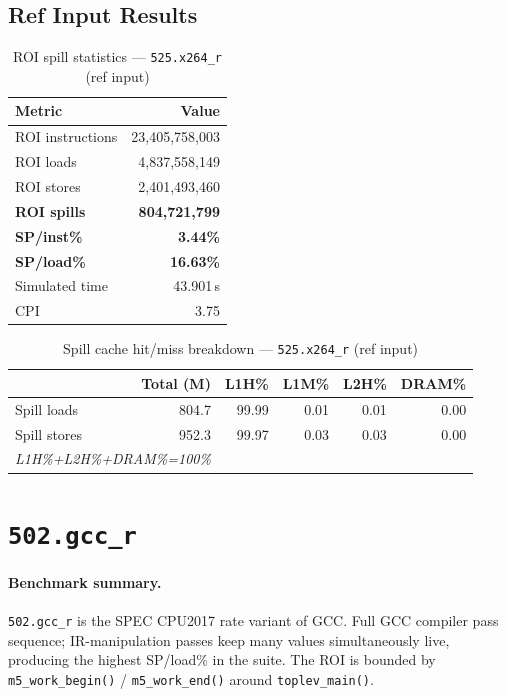 \documentclass[11pt,a4paper]{article}
\begin{document}
\subsection{Ref Input Results}

\begin{table}[H]
\centering
\caption{ROI spill statistics --- \texttt{525.x264\_r} (ref input)}
\label{tab:x264_ref_roi}
\begin{tabular}{lr}
\toprule
\textbf{Metric} & \textbf{Value} \\
\midrule
ROI instructions & 23,405,758,003 \\
ROI loads        & 4,837,558,149 \\
ROI stores       & 2,401,493,460 \\
\textbf{ROI spills}   & \textbf{804,721,799} \\
\textbf{SP/inst\%}   & \textbf{3.44\%} \\
\textbf{SP/load\%}   & \textbf{16.63\%} \\
Simulated time   & 43.901\,s \\
CPI              & 3.75 \\
\bottomrule
\end{tabular}
\end{table}

\begin{table}[H]
\centering
\caption{Spill cache hit/miss breakdown --- \texttt{525.x264\_r} (ref input)}
\label{tab:x264_ref_cache}
\begin{tabular}{lrrrrr}
\toprule
\textbf{} & \textbf{Total (M)} & \textbf{L1H\%} & \textbf{L1M\%} & \textbf{L2H\%} & \textbf{DRAM\%} \\
\midrule
Spill loads  & 804.7 & 99.99 & 0.01 & 0.01 & 0.00 \\
Spill stores & 952.3 & 99.97 & 0.03 & 0.03 & 0.00 \\
\multicolumn{2}{l}{\small\textit{L1H\%+L2H\%+DRAM\%=100\%}} \\
\bottomrule
\end{tabular}
\end{table}


\section{\texttt{502.gcc\_r}}
\label{sec:gcc}

\paragraph{Benchmark summary.}
\texttt{502.gcc\_r} is the SPEC CPU2017 rate variant of GCC.
Full GCC compiler pass sequence; IR-manipulation passes keep many values simultaneously live, producing the highest SP/load\% in the suite.
The ROI is bounded by \texttt{m5\_work\_begin()} / \texttt{m5\_work\_end()}
around \texttt{toplev\_main()}.
\end{document}
